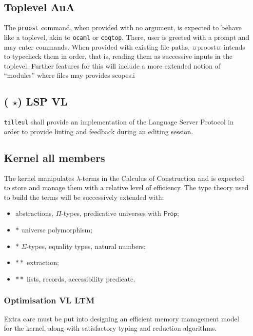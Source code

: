 \documentclass[twocolumn]{article}
\newcommand{\members}[1]{\texorpdfstring{\hfill\scriptsize #1}{}}
\newcommand{\etun}{({\color{Green} $\star$}) }
\begin{document}
\subsection{Toplevel  \members{AuA}}
The \texttt{proost} command, when provided with no argument, is expected to behave like a toplevel, akin to \texttt{ocaml} or \texttt{coqtop}. There, user is greeted with a prompt and may enter commands. When provided with existing file paths, ¤proost¤ intends to typecheck them in
order, that is, reading them as successive inputs in the toplevel. Further features for this will include a more extended notion of ``modules'' where files may provides scopes.i
{
  \begin{center}
  \end{center}
}

\subsection{\etun LSP \members{VL}}
\texttt{tilleul} shall provide an implementation of the Language Server Protocol in order to provide linting and feedback during an editing session.


\subsection{Kernel \members{all members}}
The kernel manipulates \(\lambda\)-terms in the Calculus of Construction and is
expected to store and manage them with a relative level of efficiency.
The type theory used to build the terms will be successively extended with:
\begin{itemize}
  \item abstractions, \(\Pi\)-types, predicative universes with \(\mathsf{Prop}\);
  \item \(*\) universe polymorphism;
  \item \(*\) \(\Sigma\)-types, equality types, natural numbers;
  \item \(**\) extraction;
  \item \(**\) lists, records, accessibility predicate.
\end{itemize}


\subsubsection{Optimisation \members{VL LTM}}
Extra care must be put into designing an efficient memory management model for
the kernel, along with satisfactory typing and reduction algorithms.
\end{document}
